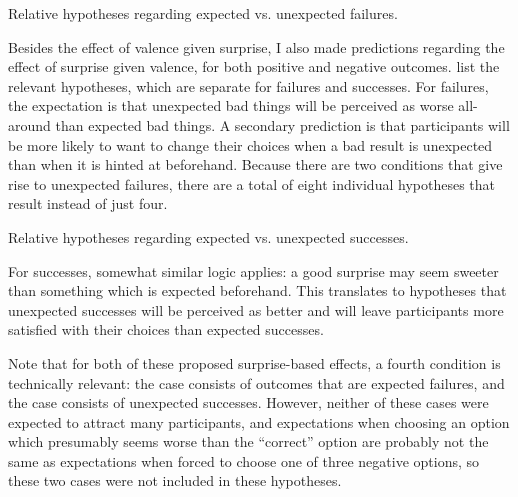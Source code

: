 \begin{table}[!h]
\centering
\bgroup
\def\arraystretch{1.3}
\setlength{\tabcolsep}{0.6em}

\egroup
\caption[Retrospective expected vs. unexpected failure hypotheses]{Relative hypotheses regarding expected vs. unexpected failures.}
\label{tab:e2-expected-vs-unexpected-failure-hypotheses}
\end{table}

Besides the effect of valence given surprise, I also made predictions regarding the effect of surprise given valence, for both positive and negative outcomes.
%
 list the relevant hypotheses, which are separate for failures and successes.
%
For failures, the expectation is that unexpected bad things will be perceived as worse all-around than expected bad things.
%
A secondary prediction is that participants will be more likely to want to change their choices when a bad result is unexpected than when it is hinted at beforehand.
%
Because there are two conditions that give rise to unexpected failures, there are a total of eight individual hypotheses that result instead of just four.

\begin{table}[!h]
\centering
\bgroup
\def\arraystretch{1.3}
\setlength{\tabcolsep}{0.6em}

\egroup
\caption[Retrospective expected vs. unexpected success hypotheses]{Relative hypotheses regarding expected vs. unexpected successes.}
\label{tab:e2-expected-vs-unexpected-success-hypotheses}
\end{table}

For successes, somewhat similar logic applies: a good surprise may seem sweeter than something which is expected beforehand.
%
This translates to hypotheses that unexpected successes will be perceived as better and will leave participants more satisfied with their choices than expected successes.


Note that for both of these proposed surprise-based effects, a fourth condition is technically relevant: the \obvsa{} case consists of outcomes that are expected failures, and the \obvfa{} case consists of unexpected successes.
%
However, neither of these cases were expected to attract many participants, and expectations when choosing an option which presumably seems worse than the ``correct'' option are probably not the same as expectations when forced to choose one of three negative options, so these two cases were not included in these hypotheses.



